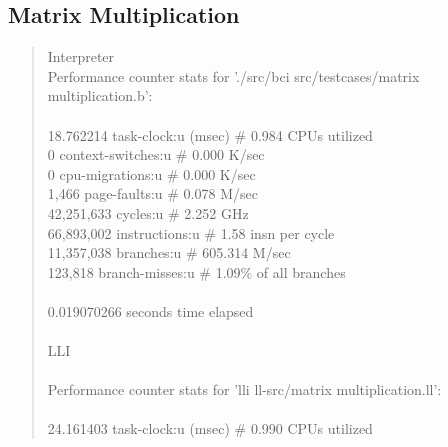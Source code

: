 \documentclass[12pt]{report}
\begin{document}
\subsection*{Matrix Multiplication}

\begin{quote}
 Interpreter \\ 

 Performance counter stats for './src/bci src/testcases/matrix multiplication.b':    \\ 
                                                                                     \\ 
         18.762214      task-clock:u (msec)       \#    0.984 CPUs utilized          \\ 
                 0      context-switches:u        \#    0.000 K/sec                  \\ 
                 0      cpu-migrations:u          \#    0.000 K/sec                  \\ 
             1,466      page-faults:u             \#    0.078 M/sec                  \\ 
        42,251,633      cycles:u                  \#    2.252 GHz                    \\ 
        66,893,002      instructions:u            \#    1.58  insn per cycle         \\ 
        11,357,038      branches:u                \#  605.314 M/sec                  \\ 
           123,818      branch-misses:u           \#    1.09\% of all branches       \\ 
                                                                                     \\ 
       0.019070266 seconds time elapsed                                              \\ 
                                                                                     \\ 
LLI                                                                                     \\ 
\\
 Performance counter stats for 'lli ll-src/matrix multiplication.ll':                \\ 
                                                                                     \\ 
         24.161403      task-clock:u (msec)       \#    0.990 CPUs utilized          \\ 

\end{quote}
\end{document}
